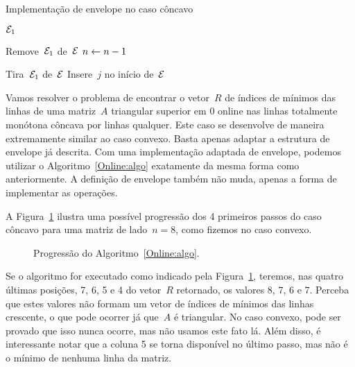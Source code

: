 \begin{algorithm}[b]
\caption{Implementação de envelope no caso côncavo}
\label{Online:Concave:algo}
\begin{algorithmic}[1]
    \State \Return $\mathcal{E}_{1}$
\EndFunction

     \label{Online:Convexo:algo:RemTira}
        \State Remove~$\mathcal{E}_{1}$ de~$\mathcal{E}$
    \EndIf
    \State $n \leftarrow n-1$
\EndFunction

 
     
         
            \State Tira~$\mathcal{E}_{1}$ de~$\mathcal{E}$
        \EndWhile
        \State Insere~$j$ no início de~$\mathcal{E}$
    \EndIf
\EndFunction
\end{algorithmic}
\end{algorithm}

Vamos resolver o problema de encontrar o vetor~$R$ de índices de mínimos das linhas de uma matriz~$A$ triangular superior em 0 online nas linhas totalmente monótona côncava por linhas qualquer. Este caso se desenvolve de maneira extremamente similar ao caso convexo. Basta apenas adaptar a estrutura de envelope já descrita. Com uma implementação adaptada de envelope, podemos utilizar o Algoritmo~\ref{Online:algo} exatamente da mesma forma como anteriormente. A definição de envelope também não muda, apenas a forma de implementar as operações.

A Figura~\ref{Online:progressConcave:fig} ilustra uma possível progressão dos 4 primeiros passos do caso côncavo para uma matriz de lado~${n=8}$, como fizemos no caso convexo.

\begin{figure}[h]
    \centering
    
    \caption{Progressão do Algoritmo~\ref{Online:algo}.} \label{Online:progressConcave:fig}
\end{figure}

Se o algoritmo for executado como indicado pela Figura~\ref{Online:progressConcave:fig}, teremos, nas quatro últimas posições, 7, 6, 5 e 4 do vetor~$R$ retornado, os valores 8, 7, 6 e 7. Perceba que estes valores não formam um vetor de índices de mínimos das linhas crescente, o que pode ocorrer já que~$A$ é triangular. No caso convexo, pode ser provado que isso nunca ocorre, mas não usamos este fato lá. Além disso, é interessante notar que a coluna 5 se torna disponível no último passo, mas não é o mínimo de nenhuma linha da matriz. 

